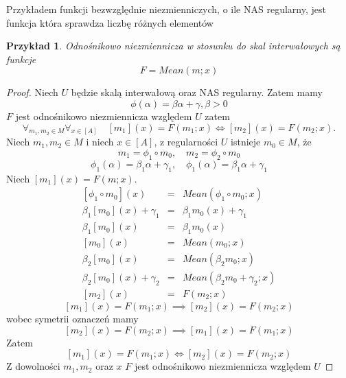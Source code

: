 \documentclass[12pt,a4paper]{report}
\newtheorem{przyklad}{Przykład}
\newcommand{\domkniecie}[1]{\left\lbrack{#1}\right\rbrack}
\begin{document}
Przykładem funkcji bezwzględnie niezmienniczych, o ile NAS regularny, jest funkcja która sprawdza liczbę różnych elementów
\begin{przyklad}
Odnośnikowo niezmiennicza w stosunku do skal interwałowych są funkcje
$$
F=Mean(m;x)
$$ 
\end{przyklad}
\begin{proof}
Niech $U$ będzie skalą interwałową oraz NAS regularny. Zatem mamy
$$
\phi(\alpha)=\beta\alpha + \gamma, \beta>0
$$
$F$ jest odnośnikowo niezmiennicza względem $U$ zatem
$$
\forall_{m_{1}, m_{2} \in M}\forall_{x \in \domkniecie{A}} \quad \domkniecie{m_{1}}(x)=F(m_{1};x) \iff \domkniecie{m_{2}}(x)=F(m_{2};x).
$$
Niech $m_1,m_2\in M$ i niech $x\in \domkniecie{A}$, z regularności $U$ istnieje $m_0 \in M$, że
$$
m_1 = \phi_1 \circ m_0, \quad m_2=\phi_2\circ m_0
$$
$$
\phi_1(\alpha)=\beta_1 \alpha + \gamma_1, \quad \phi_1(\alpha)=\beta_1 \alpha + \gamma_1
$$
Niech $\domkniecie{m_1}(x)=F(m;x)$.
\begin{eqnarray*}
\domkniecie{\phi_1\circ m_0}(x) & = & Mean(\phi_1\circ m_0;x) \\
\beta_1\domkniecie{m_0}(x)+ \gamma_1 & = & \beta_1 m_0(x) + \gamma_1 \\
\beta_1\domkniecie{m_0}(x) & = & \beta_1 m_0(x) \\
\domkniecie{m_0}(x) & = & Mean(m_0;x) \\
\beta_2\domkniecie{m_0}(x) & = & Mean(\beta_2 m_0;x) \\
\beta_2\domkniecie{m_0}(x) + \gamma_2 & = & Mean(\beta_2 m_0 + \gamma_2;x)  \\
\domkniecie{m_2}(x) & = & F(m_2;x) 
\end{eqnarray*}
$$
\domkniecie{m_1}(x)=F(m_1;x) \implies \domkniecie{m_2}(x)=F(m_2;x)
$$
wobec symetrii oznaczeń mamy
$$
\domkniecie{m_2}(x)=F(m_2;x) \implies \domkniecie{m_1}(x)=F(m_1;x)
$$
Zatem
$$
\domkniecie{m_1}(x)=F(m_1;x) \iff \domkniecie{m_2}(x)=F(m_2;x)
$$
Z dowolności $m_1,m_2$ oraz $x$ $F$ jest odnośnikowo niezmiennicza względem $U$
\end{proof}
\end{document}
